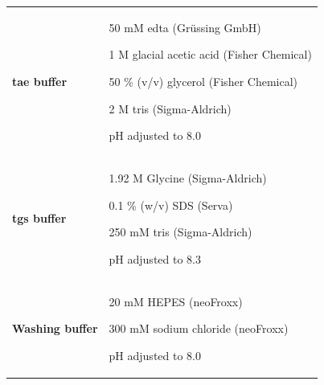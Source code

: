 \begin{longtable}{|Y{3.9cm}|m{10.7cm}|}
\textbf{\Gls{tae} buffer} & \vspace{2mm}  
            50 mM 	\gls{edta}	  (Grüssing GmbH)          \par \vspace{2mm}
            1 M	glacial acetic acid	  (Fisher Chemical)      \par \vspace{2mm}
            50 \% (v/v)	glycerol	  (Fisher Chemical)      \par \vspace{2mm}
            2 M	\gls{tris}	  (Sigma-Aldrich)                 \par \vspace{2mm}
            pH adjusted to 8.0  \vspace{2mm} \\

\textbf{\Gls{tgs} buffer} & \vspace{2mm}
            1.92 M Glycine	  (Sigma-Aldrich)         \par \vspace{2mm}
            0.1 \% (w/v)	\gls{SDS}  	(Serva)      \par \vspace{2mm}
            250 mM	\gls{tris}  	(Sigma-Aldrich)  \par \vspace{2mm}
            pH adjusted to 8.3  \vspace{2mm}\\

\textbf{Washing buffer} &  \vspace{2mm}                
            20 mM \gls{HEPES}   (neoFroxx)       \par \vspace{2mm}
            300 mM sodium chloride   (neoFroxx)  \par \vspace{2mm}
            pH adjusted to 8.0 \\  
\end{longtable}

